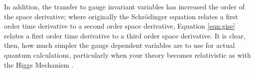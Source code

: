 In addition, the transfer to gauge invariant variables has increased the order
of the space derivative; where originally the Schr\"odinger equation relates a
first order time derivative to a second order space derivative, Equation
\ref{eqn:gise} relates a first order time derivative to a third order space
derivative. It is clear, then, how much simpler the gauge dependent variables
are to use for actual quantum calculations, particularly when your theory
becomes relativistic as with the Higgs Mechanism
\cite{higgs-1964,englert-brout,guralnik-hagen-kibble}.
